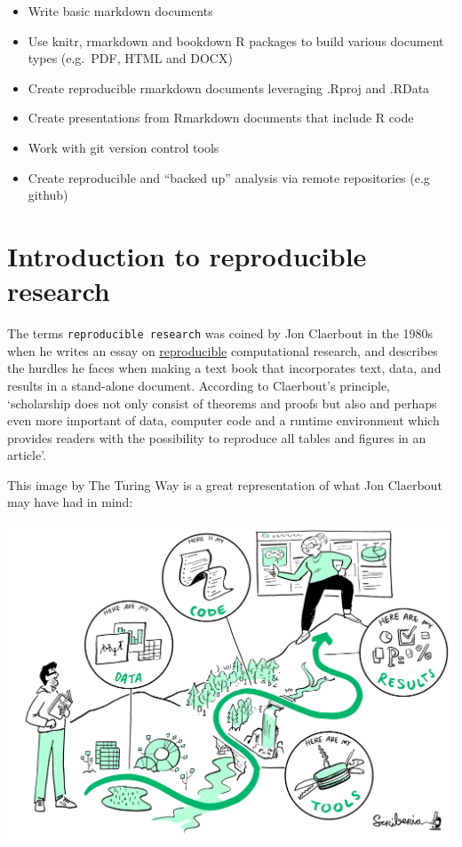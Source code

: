 \documentclass[
]{book}
\providecommand{\tightlist}{%
  \setlength{\itemsep}{0pt}\setlength{\parskip}{0pt}}
\begin{document}
\begin{itemize}
\tightlist
\item
  Write basic markdown documents\\
\item
  Use knitr, rmarkdown and bookdown R packages to build various document types (e.g.~PDF, HTML and DOCX)\\
\item
  Create reproducible rmarkdown documents leveraging .Rproj and .RData\\
\item
  Create presentations from Rmarkdown documents that include R code\\
\item
  Work with git version control tools\\
\item
  Create reproducible and ``backed up'' analysis via remote repositories (e.g github)
\end{itemize}

\hypertarget{introduction-to-reproducible-research}{%
\chapter{Introduction to reproducible research}\label{introduction-to-reproducible-research}}

The terms \texttt{reproducible\ research} was coined by Jon Claerbout in the 1980s when he writes an essay on \href{http://sepwww.stanford.edu/sep/jon/reproducible.html}{reproducible} computational research, and describes the hurdles he faces when making a text book that incorporates text, data, and results in a stand-alone document. According to Claerbout's principle, `scholarship does not only consist of theorems and proofs but also and perhaps even more important of data, computer code and a runtime environment which provides readers with the possibility to reproduce all tables and figures in an article'.

This image by The Turing Way is a great representation of what Jon Claerbout may have had in mind:

\includegraphics{rr-presentation-figure/ReproducibleJourney.jpg}
\end{document}
